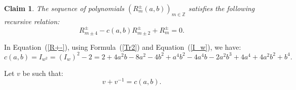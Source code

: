 \documentclass[a4paper]{amsart}
\theoremstyle{plain}
\newtheorem{claim}[theorem]{Claim}
\theoremstyle{definition}
\theoremstyle{remark}
\newcommand{\ZZ}{{\mathbb Z}}
\begin{document}
\begin{claim} \label{R}
The sequence of polynomials $\left( {R^{\pm}_m(a,b)} \right)_{m \in \ZZ}$  satisfies the following recursive relation:
\begin{equation}\label{R+-}
R^{\pm}_{m\pm 4} - c(a,b) R^{\pm}_{m \pm 2} + R^{\pm}_m =0.
\end{equation}
\end{claim}

In Equation~(\ref{R+-}),  using Formula~(\ref{Tr2}) and Equation~(\ref{I_w}), we have:
\[
c(a,b) = I_{w^2} = ({I_w})^2 - 2 = 2+4a^2b-8a^2-4b^2+a^4b^2-4a^4b-2a^2b^3+4a^4+4a^2b^2+b^4.
\]

Let $v$ be such that:
\begin{equation}\label{u/c}
v + v^{-1}=c(a,b).
\end{equation}
\end{document}
